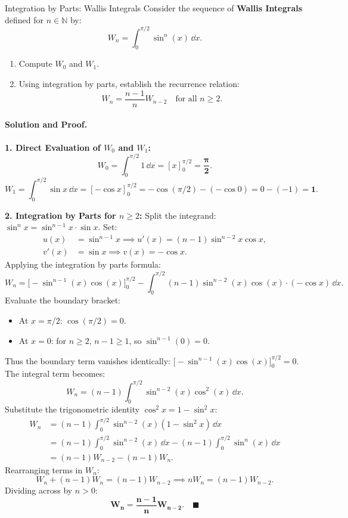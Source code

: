 \begin{workedexample}{Integration by Parts: Wallis Integrals}
Consider the sequence of \textbf{Wallis Integrals} defined for $n \in \mathbb{N}$ by:
\[
W_n = \int_0^{\pi/2} \sin^n(x)\,\dd x.
\]
\begin{enumerate}[leftmargin=1.4em,itemsep=2pt]
  \item Compute $W_0$ and $W_1$.
  \item Using integration by parts, establish the recurrence relation:
  \[
  W_n = \frac{n - 1}{n} W_{n-2} \quad \text{for all } n \ge 2.
  \]
\end{enumerate}

\paragraph{Solution and Proof.}
\textbf{1. Direct Evaluation of $W_0$ and $W_1$:}
\[
W_0 = \int_0^{\pi/2} 1\,\dd x = [x]_0^{\pi/2} = \mathbf{\frac{\pi}{2}}.
\]
\[
W_1 = \int_0^{\pi/2} \sin x\,\dd x = [-\cos x]_0^{\pi/2} = -\cos(\pi/2) - (-\cos 0) = 0 - (-1) = \mathbf{1}.
\]

\textbf{2. Integration by Parts for $n \ge 2$:}
Split the integrand: $\sin^n x = \sin^{n-1} x \cdot \sin x$.
Set:
\begin{align*}
u(x) &= \sin^{n-1} x \implies u'(x) = (n-1) \sin^{n-2} x \cos x, \\
v'(x) &= \sin x \implies v(x) = -\cos x.
\end{align*}
Applying the integration by parts formula:
\[
W_n = \big[ -\sin^{n-1}(x) \cos(x) \big]_0^{\pi/2} - \int_0^{\pi/2} (n-1) \sin^{n-2}(x) \cos(x) \cdot (-\cos x)\,\dd x.
\]
Evaluate the boundary bracket:
\begin{itemize}[itemsep=1pt]
  \item At $x = \pi/2$: $\cos(\pi/2) = 0$.
  \item At $x = 0$: for $n \ge 2$, $n - 1 \ge 1$, so $\sin^{n-1}(0) = 0$.
\end{itemize}
Thus the boundary term vanishes identically: $\big[ -\sin^{n-1}(x) \cos(x) \big]_0^{\pi/2} = 0$.
The integral term becomes:
\[
W_n = (n - 1) \int_0^{\pi/2} \sin^{n-2}(x) \cos^2(x)\,\dd x.
\]
Substitute the trigonometric identity $\cos^2 x = 1 - \sin^2 x$:
\begin{align*}
W_n &= (n - 1) \int_0^{\pi/2} \sin^{n-2}(x) (1 - \sin^2 x)\,\dd x \\
    &= (n - 1) \int_0^{\pi/2} \sin^{n-2}(x)\,\dd x - (n - 1) \int_0^{\pi/2} \sin^n(x)\,\dd x \\
    &= (n - 1) W_{n-2} - (n - 1) W_n.
\end{align*}
Rearranging terms in $W_n$:
\[
W_n + (n - 1) W_n = (n - 1) W_{n-2} \implies n W_n = (n - 1) W_{n-2}.
\]
Dividing across by $n > 0$:
\[
\mathbf{W_n = \frac{n - 1}{n} W_{n-2}}. \quad \blacksquare
\]
\end{workedexample}


